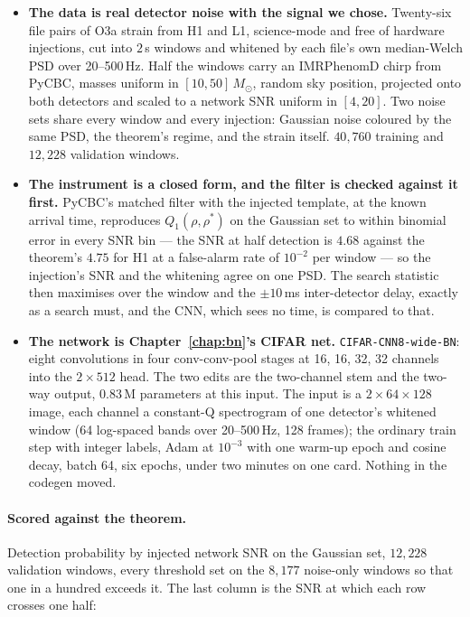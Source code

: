 \begin{itemize}
  \item \textbf{The data is real detector noise with the signal we chose.}
    Twenty-six file pairs of O3a strain from H1 and L1, science-mode and free
    of hardware injections, cut into $2$\,s windows and whitened by each
    file's own median-Welch PSD over 20--500\,Hz. Half the windows carry an
    IMRPhenomD chirp from PyCBC, masses uniform in $[10, 50]\,M_\odot$, random
    sky position, projected onto both detectors and scaled to a network SNR
    uniform in $[4, 20]$. Two noise sets share every window and every
    injection: Gaussian noise coloured by the same PSD, the theorem's regime,
    and the strain itself. $40{,}760$ training and $12{,}228$ validation
    windows.
  \item \textbf{The instrument is a closed form, and the filter is checked
    against it first.} PyCBC's matched filter with the injected template, at
    the known arrival time, reproduces $Q_1(\rho, \rho^\ast)$ on the Gaussian
    set to within binomial error in every SNR bin --- the SNR at half
    detection is $4.68$ against the theorem's $4.75$ for H1 at a false-alarm
    rate of $10^{-2}$ per window --- so the injection's SNR and the whitening
    agree on one PSD. The search statistic then maximises over the window
    and the $\pm 10$\,ms inter-detector delay, exactly as a search must, and
    the CNN, which sees no time, is compared to that.
  \item \textbf{The network is Chapter~\ref{chap:bn}'s CIFAR net.}
    \texttt{CIFAR-CNN8-wide-BN}: eight convolutions in four conv-conv-pool
    stages at 16, 16, 32, 32 channels into the $2 \times 512$ head. The two
    edits are the two-channel stem and the two-way output, $0.83$\,M
    parameters at this input. The input is a
    $2 \times 64 \times 128$ image, each channel a constant-Q spectrogram
    of one detector's whitened window (64 log-spaced bands over
    20--500\,Hz, 128 frames); the ordinary train step with integer labels,
    Adam at $10^{-3}$ with one warm-up epoch and cosine decay, batch 64,
    six epochs, under two minutes on one card. Nothing in the codegen
    moved.
\end{itemize}

\paragraph{Scored against the theorem.} Detection probability by injected
network SNR on the Gaussian set, $12{,}228$ validation windows, every
threshold set on the $8{,}177$ noise-only windows so that one in a hundred
exceeds it. The last column is the SNR at which each row crosses one half:

